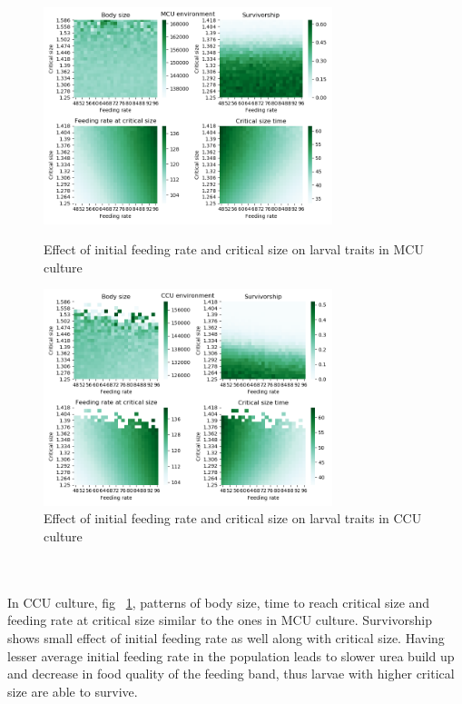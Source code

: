 \begin{figure}[!tbp]
  \centering
  \includegraphics[width=0.75\textwidth]{C3/Figs/Critical size_vs_Feeding rate_MCU}
  \caption{Effect of initial feeding rate and critical size on larval traits in MCU culture}
  \label{fig:fr vs cs mcu}
  \vspace{24pt}
  \includegraphics[width=0.75\textwidth]{C3/Figs/Critical size_vs_Feeding rate_CCU}
  \caption{Effect of initial feeding rate and critical size on larval traits in CCU culture}
  \label{fig:fr vs cs ccu}
\end{figure}\\\\
In CCU culture, fig ~\ref{fig:fr vs cs ccu}, patterns of body size, time to reach critical size and feeding rate at critical size similar to the ones in MCU culture. Survivorship shows small effect of initial feeding rate as well along with critical size. Having lesser average initial feeding rate in the population leads to slower urea build up and decrease in food quality of the feeding band, thus larvae with higher critical size are able to survive.
